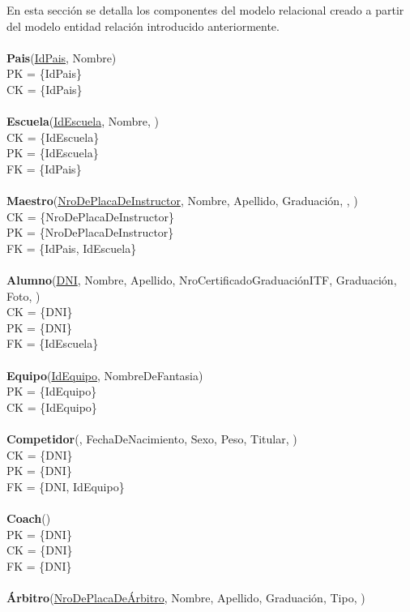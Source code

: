 En esta sección se detalla los componentes del modelo relacional creado a partir del modelo entidad relación introducido anteriormente.\\
\\
\textbf{Pais}(\uline{IdPais}, Nombre)\\
PK = \{IdPais\}\\
CK = \{IdPais\}\\
\\
\textbf{Escuela}(\uline{IdEscuela}, Nombre, )\\
CK = \{IdEscuela\}\\
PK = \{IdEscuela\}\\
FK = \{IdPais\}\\
\\
\textbf{Maestro}(\uline{NroDePlacaDeInstructor}, Nombre, Apellido, Graduación, , )\\
CK = \{NroDePlacaDeInstructor\}\\
PK = \{NroDePlacaDeInstructor\}\\
FK = \{IdPais, IdEscuela\}\\
\\
\textbf{Alumno}(\uline{DNI}, Nombre, Apellido, NroCertificadoGraduaciónITF, Graduación, Foto, )\\
CK = \{DNI\}\\
PK = \{DNI\}\\
FK = \{IdEscuela\}\\
\\
\textbf{Equipo}(\uline{IdEquipo}, NombreDeFantasia)\\
PK = \{IdEquipo\}\\
CK = \{IdEquipo\}\\
\\
\textbf{Competidor}(\uline{}, FechaDeNacimiento, Sexo, Peso, Titular, )\\
CK = \{DNI\}\\
PK = \{DNI\}\\
FK = \{DNI, IdEquipo\}\\
\\
\textbf{Coach}(\uline{})\\
PK = \{DNI\}\\
CK = \{DNI\}\\
FK = \{DNI\}\\
\\
\textbf{Árbitro}(\uline{NroDePlacaDeÁrbitro}, Nombre, Apellido, Graduación, Tipo, )\\
